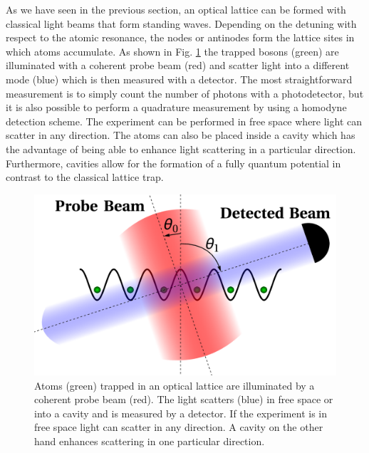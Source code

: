 
As we have seen in the previous section, an optical lattice can be
formed with classical light beams that form standing waves. Depending
on the detuning with respect to the atomic resonance, the nodes or
antinodes form the lattice sites in which atoms accumulate. As shown
in Fig. \ref{fig:LatticeDiagram} the trapped bosons (green) are
illuminated with a coherent probe beam (red) and scatter light into a
different mode (blue) which is then measured with a detector. The most
straightforward measurement is to simply count the number of photons
with a photodetector, but it is also possible to perform a quadrature
measurement by using a homodyne detection scheme. The experiment can
be performed in free space where light can scatter in any
direction. The atoms can also be placed inside a cavity which has the
advantage of being able to enhance light scattering in a particular
direction. Furthermore, cavities allow for the formation of a fully
quantum potential in contrast to the classical lattice trap.

\begin{figure}[htbp!]
  \centering
  \includegraphics[width=1.0\textwidth]{LatticeDiagram}
  \caption[Experimental Setup]{Atoms (green) trapped in an optical
    lattice are illuminated by a coherent probe beam (red). The light
    scatters (blue) in free space or into a cavity and is measured by
    a detector. If the experiment is in free space light can scatter
    in any direction. A cavity on the other hand enhances scattering
    in one particular direction.}
  \label{fig:LatticeDiagram}
\end{figure}

